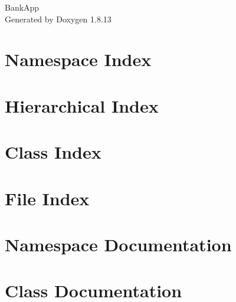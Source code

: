 \documentclass[twoside]{book}
\newcommand{\+}{\discretionary{\mbox{\scriptsize$\hookleftarrow$}}{}{}}
\newcommand{\clearemptydoublepage}{%
  \newpage{\pagestyle{empty}\cleardoublepage}%
}
\begin{document}
\hypersetup{pageanchor=false,
             bookmarksnumbered=true,
             pdfencoding=unicode
            }
\begin{titlepage}
\vspace*{7cm}
\begin{center}%
{\Large Bank\+App }\\
\vspace*{1cm}
{\large Generated by Doxygen 1.8.13}\\
\end{center}
\end{titlepage}
\clearemptydoublepage
{}
\tableofcontents
\clearemptydoublepage
{}
\hypersetup{pageanchor=true}

\chapter{Namespace Index}

\chapter{Hierarchical Index}

\chapter{Class Index}

\chapter{File Index}

\chapter{Namespace Documentation}



\chapter{Class Documentation}



















\end{document}
